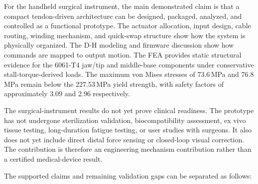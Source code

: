 For the handheld surgical instrument, the main demonstrated claim is that a compact tendon-driven architecture can be designed, packaged, analyzed, and controlled as a functional prototype. The actuator allocation, input design, cable routing, winding mechanism, and quick-swap structure show how the system is physically organized. The D-H modeling and firmware discussion show how commands are mapped to output motion. The FEA provides static structural evidence for the 6061-T4 jaw/tip and middle-base components under conservative stall-torque-derived loads. The maximum von Mises stresses of 73.6\,MPa and 76.8\,MPa remain below the 227.53\,MPa yield strength, with safety factors of approximately 3.09 and 2.96 respectively.

The surgical-instrument results do not yet prove clinical readiness. The prototype has not undergone sterilization validation, biocompatibility assessment, ex vivo tissue testing, long-duration fatigue testing, or user studies with surgeons. It also does not yet include direct distal force sensing or closed-loop visual correction. The contribution is therefore an engineering mechanism contribution rather than a certified medical-device result.

The supported claims and remaining validation gaps can be separated as follows:

